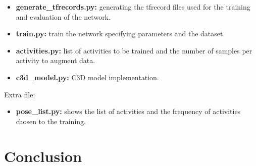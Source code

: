 \documentclass{article}
\begin{document}
\begin{itemize}
    \item \textbf{generate\_tfrecords.py:} generating the tfrecord files used for the training and evaluation of the network.
    \item \textbf{train.py:} train the network specifying parameters and the dataset.
    \item \textbf{activities.py:} list of activities to be trained and the number of samples per activity to augment data.
    \item \textbf{c3d\_model.py:} C3D model implementation.
\end{itemize}

Extra file:

\begin{itemize}
    \item \textbf{pose\_list.py:} shows the list of activities and the frequency of activities chosen to the training.
\end{itemize}


\section{Conclusion}



\clearpage



\end{document}
